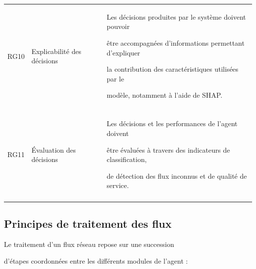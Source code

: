 \begin{table}[H]
\begin{tabularx}{\textwidth}{|p{1.4cm}|p{3.2cm}|Y|}
\hline



RG10 & Explicabilité des décisions &

Les décisions produites par le système doivent pouvoir

être accompagnées d'informations permettant d'expliquer

la contribution des caractéristiques utilisées par le

modèle, notamment à l'aide de SHAP. \\\\

\hline



RG11 & Évaluation des décisions &

Les décisions et les performances de l'agent doivent

être évaluées à travers des indicateurs de classification,

de détection des flux inconnus et de qualité de service. \\\\

\hline



\end{tabularx}

\end{table}



\subsection{Principes de traitement des flux}



Le traitement d'un flux réseau repose sur une succession

d'étapes coordonnées entre les différents modules de l'agent :



